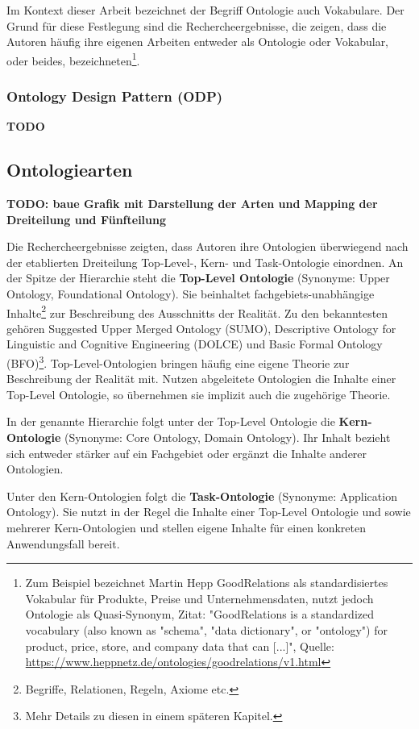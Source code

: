 \documentclass{article}
\begin{document}
Im Kontext dieser Arbeit bezeichnet der Begriff Ontologie auch Vokabulare.
Der Grund für diese Festlegung sind die Rechercheergebnisse, die zeigen, dass die Autoren häufig ihre eigenen Arbeiten entweder als Ontologie oder Vokabular, oder beides, bezeichneten\footnote{Zum Beispiel bezeichnet Martin Hepp GoodRelations als standardisiertes Vokabular für Produkte, Preise und Unternehmensdaten, nutzt jedoch Ontologie als Quasi-Synonym, Zitat: "GoodRelations is a standardized vocabulary (also known as "schema", "data dictionary", or "ontology") for product, price, store, and company data that can [...]", Quelle: \url{https://www.heppnetz.de/ontologies/goodrelations/v1.html}}.

\subsubsection{Ontology Design Pattern (ODP)}

\textbf{TODO}

\subsection{Ontologiearten}

\textbf{TODO: baue Grafik mit Darstellung der Arten und Mapping der Dreiteilung und Fünfteilung}

Die Rechercheergebnisse zeigten, dass Autoren ihre Ontologien überwiegend nach der etablierten Dreiteilung Top-Level-, Kern- und Task-Ontologie einordnen.
An der Spitze der Hierarchie steht die \textbf{Top-Level Ontologie} (Synonyme: Upper Ontology, Foundational Ontology).
Sie beinhaltet fachgebiets-unabhängige Inhalte\footnote{Begriffe, Relationen, Regeln, Axiome etc.} zur Beschreibung des Ausschnitts der Realität.
Zu den bekanntesten gehören Suggested Upper Merged Ontology (SUMO), Descriptive Ontology for Linguistic and Cognitive Engineering (DOLCE) und Basic Formal Ontology (BFO)\footnote{Mehr Details zu diesen in einem späteren Kapitel.}.
Top-Level-Ontologien bringen häufig eine eigene Theorie zur Beschreibung der Realität mit.
Nutzen abgeleitete Ontologien die Inhalte einer Top-Level Ontologie, so übernehmen sie implizit auch die zugehörige Theorie.

In der genannte Hierarchie folgt unter der Top-Level Ontologie die \textbf{Kern-Ontologie} (Synonyme: Core Ontology, Domain Ontology).
Ihr Inhalt bezieht sich entweder stärker auf ein Fachgebiet oder ergänzt die Inhalte anderer Ontologien.

Unter den Kern-Ontologien folgt die \textbf{Task-Ontologie} (Synonyme: Application Ontology).
Sie nutzt in der Regel die Inhalte einer Top-Level Ontologie und sowie mehrerer Kern-Ontologien und stellen eigene Inhalte für einen konkreten Anwendungsfall bereit.
\end{document}
